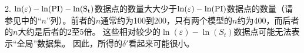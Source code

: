 \begin{Parallel}{0.60\textwidth}{}
{        2. $\ln(\varepsilon)-\ln(\rm{PI})-\ln(S_t)$数据点的数量大大少于$\ln(\varepsilon)-\ln(\rm{PI})$数据点的数量（请参见中的“$n$”列）。前者的$n$通常约为100到200，只有两个模型的$n$约为400，而后者的$n$大约是后者的2至5倍。 这些相对较少的$\ln(\varepsilon)-\ln(S_t)$数据点可能无法表示“全局”数据集。 因此，所得的$\delta'$看起来可能很小。
    }
\end{Parallel}
